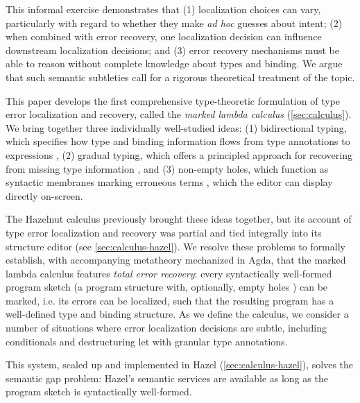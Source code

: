 This informal exercise demonstrates that (1) localization choices can vary, particularly with regard to whether they make \emph{ad hoc} guesses about intent;  
(2) when combined with error recovery, one localization decision can influence downstream localization decisions; and 
(3) error recovery mechanisms must be able to reason without complete knowledge about types and binding. We argue that such semantic subtleties call for a rigorous theoretical treatment of the topic.

This paper develops the first comprehensive {type-theoretic formulation} of type error localization and recovery, called the \emph{marked lambda calculus} (\cref{sec:calculus}).
We bring together three individually well-studied ideas: (1) bidirectional typing, which specifies how type and binding information flows from 
type annotations to expressions \cite{Localinf,BidirTyping}, (2) gradual typing, which offers a principled approach for recovering from missing type information \cite{Siek06a,siek2015refined}, and 
(3) non-empty holes, which function as syntactic membranes marking erroneous terms \cite{HazelnutPOPL}, which the editor can display directly on-screen.

The Hazelnut calculus \cite{HazelnutPOPL} previously brought these ideas together, but its account of type error localization and recovery was partial and tied integrally into its structure editor (see \cref{sec:calculus-hazel}). 
We resolve these problems to formally establish, with accompanying metatheory mechanized in Agda, that the marked lambda calculus features \emph{total error recovery}: {every} syntactically well-formed program sketch (a program structure with, optionally, empty holes \cite{solar2013program}) can be marked, i.e. its errors can be localized, such that the resulting program has a well-defined type and binding structure.
As we define the calculus, we consider a number of situations where error localization decisions are subtle, including conditionals and destructuring let with granular type annotations.

This system, scaled up and implemented in Hazel (\cref{sec:calculus-hazel}), solves the semantic gap problem: Hazel's semantic services are available as long as the program sketch is syntactically well-formed.
% 

